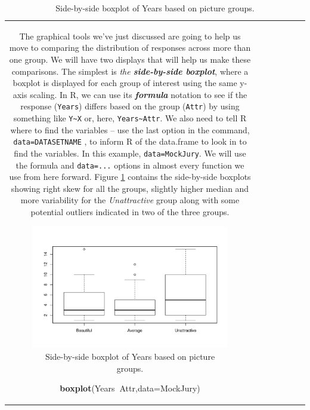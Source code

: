 \documentclass[]{book}
\newenvironment{Shaded}{\begin{snugshade}}{\end{snugshade}}
\newcommand{\KeywordTok}[1]{\textcolor[rgb]{0.13,0.29,0.53}{\textbf{#1}}}
\newcommand{\DataTypeTok}[1]{\textcolor[rgb]{0.13,0.29,0.53}{#1}}
\newcommand{\OperatorTok}[1]{\textcolor[rgb]{0.81,0.36,0.00}{\textbf{#1}}}
\newcommand{\NormalTok}[1]{#1}
\theoremstyle{definition}
\theoremstyle{definition}
\theoremstyle{remark}
\begin{document}
\begin{longtable}[]{@{}ccccccc@{}}
\begin{minipage}[b]{0.10\columnwidth}
The graphical tools we've just discussed are going to help us move to
comparing the distribution of responses across more than one group. We
will have two displays that will help us make these comparisons. The
simplest is \emph{the \textbf{side-by-side boxplot}}, where a boxplot is
displayed for each group of interest using the same y-axis scaling. In
R, we can use its \textbf{\emph{formula}} notation to see if the
response (\texttt{Years}) differs based on the group (\texttt{Attr}) by
using something like \texttt{Y\textasciitilde{}X} or, here,
\texttt{Years\textasciitilde{}Attr}. We also need to tell R where to
find the variables -- use the last option in the command,
\texttt{data=DATASETNAME} , to inform R of the data.frame to look in to
find the variables. In this example, \texttt{data=MockJury}. We will use
the formula and \texttt{data=...} options in almost every function we
use from here forward. Figure \ref{fig:Figure2-4} contains the
side-by-side boxplots showing right skew for all the groups, slightly
higher median and more variability for the \emph{Unattractive} group
along with some potential outliers indicated in two of the three groups.



\begin{figure}
\centering
\includegraphics{02-reintroductionToStatistics_files/figure-latex/Figure2-4-1.pdf}
\caption{\label{fig:Figure2-4}Side-by-side boxplot of Years based on picture groups.}
\end{figure}

\begin{Shaded}
\begin{Highlighting}[]
\KeywordTok{boxplot}\NormalTok{(Years}\OperatorTok{~}\NormalTok{Attr,}\DataTypeTok{data=}\NormalTok{MockJury)}
\end{Highlighting}
\end{Shaded}


\end{minipage}
\end{longtable}
\end{document}
